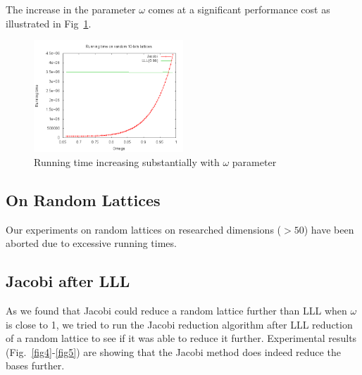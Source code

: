 \documentclass[10pt, a4paper]{article}
\begin{document}
The increase in the parameter $\omega$ comes at a significant performance cost as illustrated in Fig~\ref{fig3}.

\begin{figure}[H]
\centering
\includegraphics[width=0.5\textwidth]{results-graphs/runningtime.png}

\caption{Running time increasing substantially with $\omega$ parameter}
\label{fig3}
\end{figure}

\subsection{On Random Lattices}

Our experiments on random lattices on researched dimensions ($> 50$) have been aborted due to excessive running times.

\subsection{Jacobi after LLL}

As we found that Jacobi could reduce a random lattice further than LLL when $\omega$ is close to 1, we tried to run the Jacobi reduction algorithm after LLL reduction of a random lattice to see if it was able to reduce it further. Experimental results (Fig.~\ref{fig4}-\ref{fig5}) are showing that the Jacobi method does indeed reduce the bases further.
\end{document}

